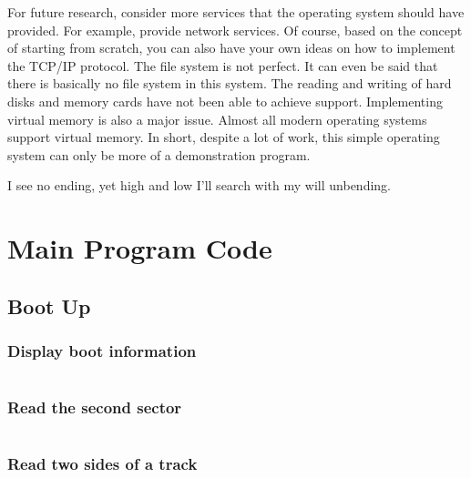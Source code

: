 \documentclass{swfcthesis}
\begin{document}
For future research, consider more services that the operating system should have
provided. For example, provide network services. Of course, based on the concept of
starting from scratch, you can also have your own ideas on how to implement the TCP/IP
protocol. The file system is not perfect. It can even be said that there is basically no
file system in this system. The reading and writing of hard disks and memory cards have
not been able to achieve support. Implementing virtual memory is also a major
issue. Almost all modern operating systems support virtual memory. In short, despite a lot
of work, this simple operating system can only be more of a demonstration program.

I see no ending, yet high and low I’ll search with my will unbending.


\appendix{}
\maketailpages{} %


\chapter{Main Program Code} %

\section{Boot Up}

\subsection{Display boot information}
\label{sec:dis-boo-inf}

\inputminted[firstline=55, lastline=65,
linenos=true]{nasm}{../../src/kernel/ipl10.asm}

\subsection{Read the second sector}
\label{sec:rea-sec-sec}
  
\inputminted[firstline=87,lastline=106,linenos=true]{nasm}{../../src/kernel/ipl10.asm}

\subsection{Read two sides of a track}
\label{sec:rea-two-sid}
\end{document}
